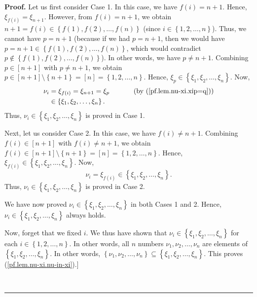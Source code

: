 \documentclass
[numbers=enddot,12pt,final,onecolumn,notitlepage,english]{scrartcl}%
\theoremstyle{definition}
\newenvironment{proof}[1][Proof]{\noindent\textbf{#1.} }{\ \rule{0.5em}{0.5em}}
\newenvironment{verlong}{}{}
\begin{document}
\begin{verlong}
\begin{proof}
Let us first consider Case 1. In this case, we have $f\left(  i\right)  =n+1$.
Hence, $\xi_{f\left(  i\right)  }=\xi_{n+1}$. However, from $f\left(
i\right)  =n+1$, we obtain $n+1=f\left(  i\right)  \in\left\{  f\left(
1\right)  ,f\left(  2\right)  ,\ldots,f\left(  n\right)  \right\}  $ (since
$i\in\left\{  1,2,\ldots,n\right\}  $). Thus, we cannot have $p=n+1$ (because
if we had $p=n+1$, then we would have $p=n+1\in\left\{  f\left(  1\right)
,f\left(  2\right)  ,\ldots,f\left(  n\right)  \right\}  $, which would
contradict $p\notin\left\{  f\left(  1\right)  ,f\left(  2\right)
,\ldots,f\left(  n\right)  \right\}  $). In other words, we have $p\neq n+1$.
Combining $p\in\left[  n+1\right]  $ with $p\neq n+1$, we obtain $p\in\left[
n+1\right]  \setminus\left\{  n+1\right\}  =\left[  n\right]  =\left\{
1,2,\ldots,n\right\}  $. Hence, $\xi_{p}\in\left\{  \xi_{1},\xi_{2},\ldots
,\xi_{n}\right\}  $. Now,
\begin{align*}
\nu_{i}  &  =\xi_{f\left(  i\right)  }=\xi_{n+1}=\xi_{p}%
\ \ \ \ \ \ \ \ \ \ \left(  \text{by (\ref{pf.lem.nu-xi.xip=q})}\right) \\
&  \in\left\{  \xi_{1},\xi_{2},\ldots,\xi_{n}\right\}  .
\end{align*}
Thus, $\nu_{i}\in\left\{  \xi_{1},\xi_{2},\ldots,\xi_{n}\right\}  $ is proved
in Case 1.

Next, let us consider Case 2. In this case, we have $f\left(  i\right)  \neq
n+1$. Combining $f\left(  i\right)  \in\left[  n+1\right]  $ with $f\left(
i\right)  \neq n+1$, we obtain $f\left(  i\right)  \in\left[  n+1\right]
\setminus\left\{  n+1\right\}  =\left[  n\right]  =\left\{  1,2,\ldots
,n\right\}  $. Hence, $\xi_{f\left(  i\right)  }\in\left\{  \xi_{1},\xi
_{2},\ldots,\xi_{n}\right\}  $. Now,
\[
\nu_{i}=\xi_{f\left(  i\right)  }\in\left\{  \xi_{1},\xi_{2},\ldots,\xi
_{n}\right\}  .
\]
Thus, $\nu_{i}\in\left\{  \xi_{1},\xi_{2},\ldots,\xi_{n}\right\}  $ is proved
in Case 2.

We have now proved $\nu_{i}\in\left\{  \xi_{1},\xi_{2},\ldots,\xi_{n}\right\}
$ in both Cases 1 and 2. Hence, $\nu_{i}\in\left\{  \xi_{1},\xi_{2},\ldots
,\xi_{n}\right\}  $ always holds.

Now, forget that we fixed $i$. We thus have shown that $\nu_{i}\in\left\{
\xi_{1},\xi_{2},\ldots,\xi_{n}\right\}  $ for each $i\in\left\{
1,2,\ldots,n\right\}  $. In other words, all $n$ numbers $\nu_{1},\nu
_{2},\ldots,\nu_{n}$ are elements of $\left\{  \xi_{1},\xi_{2},\ldots,\xi
_{n}\right\}  $. In other words, $\left\{  \nu_{1},\nu_{2},\ldots,\nu
_{n}\right\}  \subseteq\left\{  \xi_{1},\xi_{2},\ldots,\xi_{n}\right\}  $.
This proves (\ref{pf.lem.nu-xi.nu-in-xi}).] \medskip


\end{proof}
\end{verlong}
\end{document}
